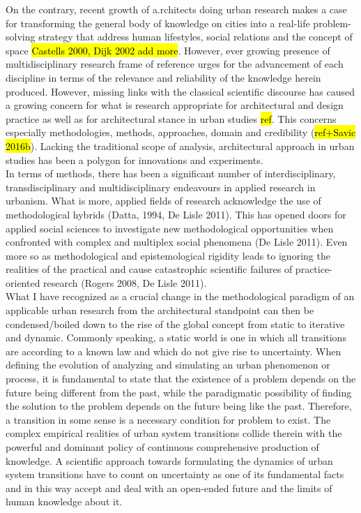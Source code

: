 \documentclass[11pt]{report}
\begin{document}
On the contrary, recent growth of a.rchitects doing urban research makes a case for transforming the general body of knowledge on cities into a real-life problem-solving strategy that address human lifestyles, social relations and the concept of space \hl{Castells 2000, Dijk 2002 add more}.
However, ever growing presence of multidisciplinary research frame of reference urges for the advancement of each discipline in terms of the relevance and reliability of the knowledge herein produced.
However, missing links with the classical scientific discourse has caused a growing concern for what is research appropriate for architectural and design practice as well as for architectural stance in urban studies \hl{ref}. This concerns especially methodologies, methods, approaches, domain and credibility (\hl{ref+Savic 2016b}). Lacking the traditional scope of analysis, architectural approach in urban studies has been a polygon for innovations and experiments.
\\
In terms of methods, there has been a significant number of interdisciplinary, transdisciplinary and multidisciplinary endeavours in applied research in urbanism. What is more, applied fields of research acknowledge the use of methodological hybrids (Datta, 1994, De Lisle 2011). This has opened doors for applied social sciences to investigate new methodological opportunities when confronted with complex and multiplex social phenomena (De Lisle 2011). Even more so as methodological and epistemological rigidity leads to ignoring the realities of the practical and cause catastrophic scientific failures of practice-oriented research (Rogers 2008, De Lisle 2011).
\\
What I have recognized as a crucial change in the methodological paradigm of an applicable urban research from the architectural standpoint can then be condensed/boiled down to the rise of the global concept from static to iterative and dynamic. Commonly speaking, a static world is one in which all transitions are according to a known law and which do not give rise to uncertainty. When defining the evolution of analyzing and simulating an urban phenomenon or process, it is fundamental to state that the existence of a problem depends on the future being different from the past, while the paradigmatic possibility of finding the solution to the problem depends on the future being like the past. Therefore, a transition in some sense is a necessary condition for problem to exist. The complex empirical realities of urban system transitions collide therein with the powerful and dominant policy of continuous comprehensive production of knowledge. A scientific approach towards formulating the dynamics of urban system transitions have to count on uncertainty as one of its fundamental facts and in this way accept and deal with an open-ended future and the limits of human knowledge about it.
\end{document}
